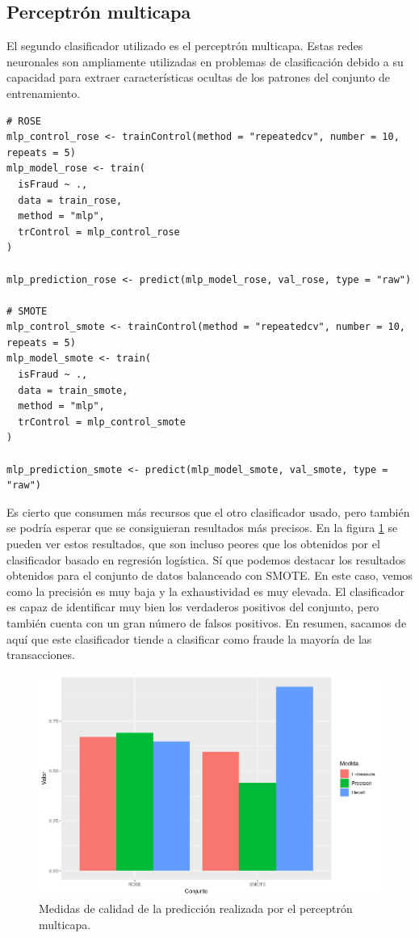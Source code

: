 \subsection{Perceptrón multicapa}
El segundo clasificador utilizado es el perceptrón multicapa. Estas redes
neuronales son ampliamente utilizadas en problemas de clasificación debido a su
capacidad para extraer características ocultas de los patrones del conjunto de
entrenamiento.

\begin{lstlisting}
# ROSE
mlp_control_rose <- trainControl(method = "repeatedcv", number = 10, repeats = 5)
mlp_model_rose <- train(
  isFraud ~ .,
  data = train_rose,
  method = "mlp",
  trControl = mlp_control_rose
)

mlp_prediction_rose <- predict(mlp_model_rose, val_rose, type = "raw")

# SMOTE
mlp_control_smote <- trainControl(method = "repeatedcv", number = 10, repeats = 5)
mlp_model_smote <- train(
  isFraud ~ .,
  data = train_smote,
  method = "mlp",
  trControl = mlp_control_smote
)

mlp_prediction_smote <- predict(mlp_model_smote, val_smote, type = "raw")
\end{lstlisting}

Es cierto que consumen más recursos que el otro clasificador usado, pero también
se podría esperar que se consiguieran resultados más precisos. En la figura
\ref{fig:mlp-barplot} se pueden ver estos resultados, que son incluso peores que
los obtenidos por el clasificador basado en regresión logística. Sí que podemos
destacar los resultados obtenidos para el conjunto de datos balanceado con
SMOTE. En este caso, vemos como la precisión es muy baja y la exhaustividad es
muy elevada. El clasificador es capaz de identificar muy bien los verdaderos
positivos del conjunto, pero también cuenta con un gran número de falsos
positivos. En resumen, sacamos de aquí que este clasificador tiende a clasificar
como fraude la mayoría de las transacciones.

\begin{figure}
    \includegraphics[width=\textwidth]{images/classification/mlp-barplot.png}
    \caption{Medidas de calidad de la predicción realizada por el perceptrón multicapa.}
    \label{fig:mlp-barplot}
\end{figure}

